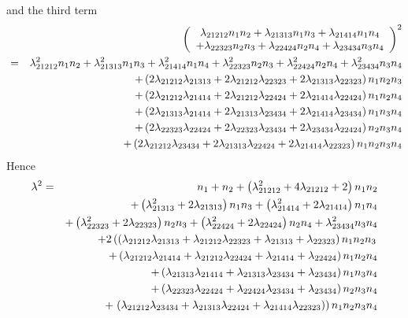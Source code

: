 \documentclass[12pt]{article}
\begin{document}
and the third term 
\begin{eqnarray}
&&\left( 
\begin{array}{c}
\lambda _{21212}n_{1}n_{2}+\lambda _{21313}n_{1}n_{3}+\lambda
_{21414}n_{1}n_{4} \\ 
+\lambda _{22323}n_{2}n_{3}+\lambda _{22424}n_{2}n_{4}+\lambda
_{23434}n_{3}n_{4}%
\end{array}%
\right) ^{2}  \notag \\
&=&\lambda _{21212}^{2}n_{1}n_{2}+\lambda _{21313}^{2}n_{1}n_{3}+\lambda
_{21414}^{2}n_{1}n_{4}+\lambda _{22323}^{2}n_{2}n_{3}+\lambda
_{22424}^{2}n_{2}n_{4}+\lambda _{23434}^{2}n_{3}n_{4}  \notag \\
&&+\left( 2\lambda _{21212}\lambda _{21313}+2\lambda _{21212}\lambda
_{22323}+2\lambda _{21313}\lambda _{22323}\right) n_{1}n_{2}n_{3}  \notag \\
&&+\left( 2\lambda _{21212}\lambda _{21414}+2\lambda _{21212}\lambda
_{22424}+2\lambda _{21414}\lambda _{22424}\right) n_{1}n_{2}n_{4}  \notag \\
&&+\left( 2\lambda _{21313}\lambda _{21414}+2\lambda _{21313}\lambda
_{23434}+2\lambda _{21414}\lambda _{23434}\right) n_{1}n_{3}n_{4}  \notag \\
&&+\left( 2\lambda _{22323}\lambda _{22424}+2\lambda _{22323}\lambda
_{23434}+2\lambda _{23434}\lambda _{22424}\right) n_{2}n_{3}n_{4}  \notag \\
&&+\left( 2\lambda _{21212}\lambda _{23434}+2\lambda _{21313}\lambda
_{22424}+2\lambda _{21414}\lambda _{22323}\right) n_{1}n_{2}n_{3}n_{4}
\end{eqnarray}%
Hence%
\begin{eqnarray}
\lambda ^{2} &=&n_{1}+n_{2}+\left( \lambda _{21212}^{2}+4\lambda
_{21212}+2\right) n_{1}n_{2}  \notag \\
&&+\left( \lambda _{21313}^{2}+2\lambda _{21313}\right) n_{1}n_{3}+\left(
\lambda _{21414}^{2}+2\lambda _{21414}\right) n_{1}n_{4}  \notag \\
&&+\left( \lambda _{22323}^{2}+2\lambda _{22323}\right) n_{2}n_{3}+\left(
\lambda _{22424}^{2}+2\lambda _{22424}\right) n_{2}n_{4}+\lambda
_{23434}^{2}n_{3}n_{4}  \notag \\
&&+2\left( \left( \lambda _{21212}\lambda _{21313}+\lambda _{21212}\lambda
_{22323}+\lambda _{21313}+\lambda _{22323}\right) n_{1}n_{2}n_{3}\right. 
\notag \\
&&+\left( \lambda _{21212}\lambda _{21414}+\lambda _{21212}\lambda
_{22424}+\lambda _{21414}+\lambda _{22424}\right) n_{1}n_{2}n_{4}  \notag \\
&&+\left( \lambda _{21313}\lambda _{21414}+\lambda _{21313}\lambda
_{23434}+\lambda _{23434}\right) n_{1}n_{3}n_{4}  \notag \\
&&+\left( \lambda _{22323}\lambda _{22424}+\lambda _{22424}\lambda
_{23434}+\lambda _{23434}\right) n_{2}n_{3}n_{4}  \notag \\
&&+\left. \left( \lambda _{21212}\lambda _{23434}+\lambda _{21313}\lambda
_{22424}+\lambda _{21414}\lambda _{22323}\right) \right) n_{1}n_{2}n_{3}n_{4}
\end{eqnarray}%
\end{document}
